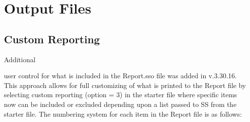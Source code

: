 \section{Output Files}

\subsection{Custom Reporting}
\hypertarget{custom}{Additional} user control for what is included in the Report.sso file was added in v.3.30.16.  This approach allows for full customizing of what is printed to the Report file by selecting custom reporting (option = 3) in the starter file where specific items now can be included or excluded depending upon a list passed to SS from the starter file.  The numbering system for each item in the Report file is as follows:

